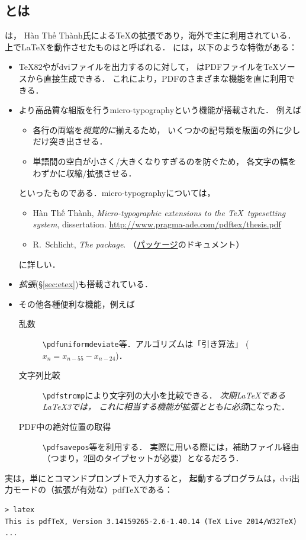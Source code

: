 \documentclass[b5paper]{bxjsarticle} %
\begin{document}
\subsection{\pdfTeX とは}
\href{http://www.tug.org/applications/pdftex/}{\emph{\pdfTeX}}\>は，
Hàn Thế Thành氏による\TeX の拡張であり，海外で主に利用されている．
\pdfTeX 上で\LaTeX を動作させたものは\pdfLaTeX と呼ばれる．
\pdfTeX には，以下のような特徴がある：
\begin{itemize}
\item \TeX82や\pTeX がdviファイルを出力するのに対して，
  \pdfTeX はPDFファイルを\TeX ソースから直接生成できる．
  これにより，PDFのさまざまな機能を直に利用できる．
\item より高品質な組版を行うmicro-typographyという機能が搭載された．
  例えば
\begin{itemize}
\item 各行の両端を\emph{視覚的に}揃えるため，
  いくつかの記号類を版面の外に少しだけ突き出させる．
\item 単語間の空白が小さく/大きくなりすぎるのを防ぐため，
  各文字の幅をわずかに収縮/拡張させる．
\end{itemize}
といったものである．micro-typographyについては，
\begin{itemize}
\item Hàn Thế Thành, \textit{Micro-typographic extensions
  to the \TeX\ typesetting system}, dissertation.
  \url{http://www.pragma-ade.com/pdftex/thesis.pdf}
\item R.~Schlicht, \textit{The  package}.
（\href{http://ctan.org/pkg/microtype}{パッケージ}のドキュメント）
\end{itemize}
に詳しい．
\item \emph{\eTeX 拡張}\>(\S\ref{sec:etex})も搭載されている．
\item その他各種便利な機能，例えば
\begin{description}
 \item[乱数] \verb+\pdfuniformdeviate+等．アルゴリズムは「引き算法」%
($x_n=x_{n-55}-x_{n-24}$)．
 \item[文字列比較] \verb+\pdfstrcmp+により文字列の大小を比較できる．
\emph{次期\LaTeX である\LaTeX3では，
これに相当する機能が\eTeX 拡張とともに必須}になった．
\item[PDF中の絶対位置の取得] \verb+\pdfsavepos+等を利用する．
実際に用いる際には，補助ファイル経由（つまり，2回のタイプセットが必要）となるだろう．
\end{description}
\end{itemize}
実は，単にとコマンドプロンプトで入力すると，
起動するプログラムは，dvi出力モードの（\eTeX 拡張が有効な）pdf\TeX である：
\begin{lstlisting}
> latex
This is pdfTeX, Version 3.14159265-2.6-1.40.14 (TeX Live 2014/W32TeX)
...
\end{lstlisting}
\end{document}
